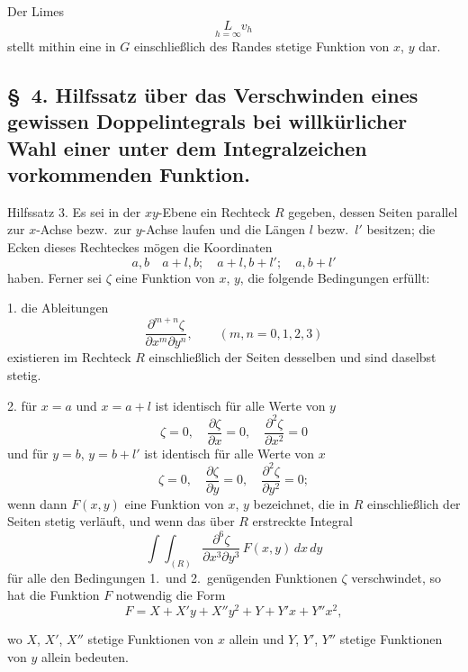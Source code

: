 \documentclass{article}
\begin{document}
Der Limes
\[
\underset{h=\infty}{L} v_h
\]
stellt mithin eine in $G$ einschließlich des Randes stetige Funktion von $x$, $y$ dar.

\subsection*{§~4. Hilfssatz über das Verschwinden eines gewissen Doppelintegrals bei willkürlicher Wahl einer unter dem Integralzeichen vorkommenden Funktion.}

Hilfssatz 3. Es sei in der $xy$-Ebene ein Rechteck $R$ gegeben, dessen Seiten parallel zur $x$-Achse bezw.\ zur $y$-Achse laufen und die Längen $l$ bezw.\ $l'$ besitzen; die Ecken dieses Rechteckes mögen die Koordinaten
\[
a, b \quad a+l, b; \quad a+l, b+l'; \quad a, b+l'
\]
haben. Ferner sei $\zeta$ eine Funktion von $x$, $y$, die folgende Bedingungen erfüllt:

1. die Ableitungen
\[
\frac{\partial^{m+n} \zeta}{\partial x^m \partial y^n}, \qquad (m, n = 0, 1, 2, 3)
\]
existieren im Rechteck $R$ einschließlich der Seiten desselben und sind daselbst stetig.

2. für $x=a$ und $x=a+l$ ist identisch für alle Werte von $y$
\[
\zeta = 0, \quad \frac{\partial\zeta}{\partial x} = 0, \quad \frac{\partial^2\zeta}{\partial x^2} = 0
\]
und für $y=b$, $y=b+l'$ ist identisch für alle Werte von $x$
\[
\zeta = 0, \quad \frac{\partial\zeta}{\partial y} = 0, \quad \frac{\partial^2\zeta}{\partial y^2} = 0;
\]
wenn dann $F(x, y)$ eine Funktion von $x$, $y$ bezeichnet, die in $R$ einschließlich der Seiten stetig verläuft, und wenn das über $R$ erstreckte Integral
\[
\int\!\!\int_{(R)} \frac{\partial^6\zeta}{\partial x^3 \partial y^3}\,F(x, y)\,dx\,dy
\]
für alle den Bedingungen 1.\ und 2.\ genügenden Funktionen $\zeta$ verschwindet, so hat die Funktion $F$ notwendig die Form
\[
F = X + X'y + X''y^2 + Y + Y'x + Y''x^2,
\]

wo $X$, $X'$, $X''$ stetige Funktionen von $x$ allein und $Y$, $Y'$, $Y''$ stetige Funktionen von $y$ allein bedeuten.
\end{document}
